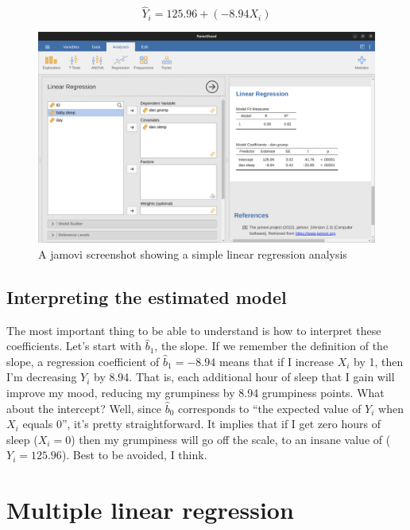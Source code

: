\documentclass[
  a4paper,
]{book}
\begin{document}
\[\hat{Y}_i=125.96+(-8.94 X_i)\]

\begin{figure}

\includegraphics[width=1\textwidth,height=\textheight]{images/fig12-13.png} \hfill{}

\caption{\label{fig-fig12-13}A jamovi screenshot showing a simple linear
regression analysis}

\end{figure}

\hypertarget{interpreting-the-estimated-model}{%
\subsection{Interpreting the estimated
model}\label{interpreting-the-estimated-model}}

The most important thing to be able to understand is how to interpret
these coefficients. Let's start with \(\hat{b}_1\), the slope. If we
remember the definition of the slope, a regression coefficient of
\(\hat{b}_1 = -8.94\) means that if I increase \(X_i\) by 1, then I'm
decreasing \(Y_i\) by 8.94. That is, each additional hour of sleep that
I gain will improve my mood, reducing my grumpiness by 8.94 grumpiness
points. What about the intercept? Well, since \(\hat{b}_0\) corresponds
to ``the expected value of \(Y_i\) when \(X_i\) equals 0'', it's pretty
straightforward. It implies that if I get zero hours of sleep
(\(X_i = 0\)) then my grumpiness will go off the scale, to an insane
value of (\(Y_i = 125.96\)). Best to be avoided, I think.

\hypertarget{multiple-linear-regression}{%
\section{Multiple linear regression}\label{multiple-linear-regression}}
\end{document}
